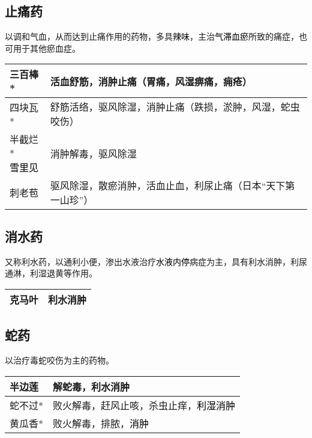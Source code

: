 \documentclass[cn,black,12pt,normal,founder]{elegantnote}
\newcommand{\redt}[1]{\textcolor{black}{{}#1}}      %
\begin{document}
\subsection{止痛药}

以调和气血，从而达到止痛作用的药物，多具\redt{辣味}，主治\redt{气滞血瘀}所致的痛症，也可用于其他瘀血症。

\begin{table}[H]
  \begin{tabular}{|l|l|}
  \hline
  三百棒* & 活血舒筋，消肿止痛（胃痛，风湿痹痛，痈疮） \\ \hline
  四块瓦* & 舒筋活络，驱风除湿，消肿止痛（跌损，淤肿，风湿，蛇虫咬伤） \\ \hline
  \makecell[l]{半截烂* \\ \redt{雪里见}} & 消肿解毒，驱风除湿 \\ \hline
  刺老苞 & 驱风除湿，散瘀消肿，活血止血，利尿止痛（日本“天下第一山珍”） \\ \hline
  \end{tabular}
\end{table}

\subsection{消水药}

又称利水药，以通利小便，渗出水液治疗\redt{水液内停}病症为主，具有利水消肿，利尿通淋，利湿退黄等作用。

\begin{table}[H]
  \begin{tabular}{|l|l|}
  \hline
  克马叶 & 利水消肿 \\ \hline
  \end{tabular}
\end{table}

\subsection{蛇药}

以治疗毒蛇咬伤为主的药物。

\begin{table}[H]
  \begin{tabular}{|l|l|}
  \hline
  半边莲 & 解蛇毒，利水消肿 \\ \hline
  蛇不过* & 败火解毒，赶风止咳，杀虫止痒，\redt{利湿消肿}  \\ \hline
  黄瓜香* & 败火解毒，排脓，\redt{消肿} \\ \hline
  \end{tabular}
\end{table}
\end{document}
